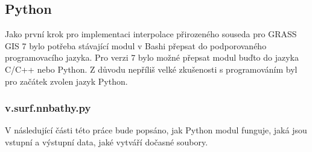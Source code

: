 \documentclass[12pt,a4paper]{article}
\begin{document}
{%

\newpage
\subsection{Python}

Jako první krok pro implementaci interpolace přirozeného souseda pro
GRASS GIS 7 bylo potřeba stávající modul v Bashi přepsat do
podporovaného programovacího jazyka. Pro verzi 7 bylo možné přepsat
modul buďto do jazyka C/C++ nebo Python. Z důvodu nepříliš velké
zkušenosti s programováním byl pro začátek zvolen jazyk Python.

\subsubsection{v.surf.nnbathy.py}

V následující části této práce bude popsáno, jak Python modul
funguje, jaká jsou vstupní a výstupní data, jaké vytváří dočasné
soubory.

}
\end{document}
